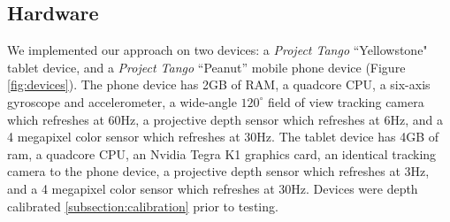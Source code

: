 \documentclass[conference,10pt]{IEEEtran}
\begin{document}
\subsection{Hardware}
We implemented our approach on two devices: a \textit{Project Tango}
``Yellowstone" tablet device, and a \textit{Project Tango} ``Peanut'' mobile 
phone
device (Figure \ref{fig:devices}). The phone device has 2GB of RAM, a quadcore
CPU, a six-axis gyroscope and accelerometer, a wide-angle $120^\circ$ field of
view tracking camera which refreshes at 60Hz, a projective depth sensor which
refreshes at 6Hz, and a 4 megapixel color sensor which refreshes at 30Hz. The
tablet device has 4GB of ram, a quadcore CPU, an Nvidia Tegra K1 graphics card,
an identical tracking camera to the phone device, a projective depth sensor
which refreshes at 3Hz, and a 4 megapixel color sensor which refreshes at 30Hz.
Devices were depth calibrated \ref{subsection:calibration} prior to testing. 
\end{document}
